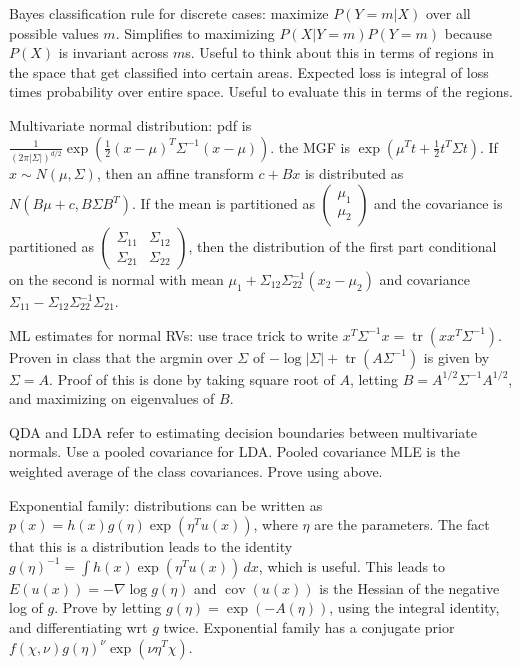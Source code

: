 \documentclass{article}
\newcommand{\openm}{\begin{pmatrix}}
\newcommand{\closem}{\end{pmatrix}}
\DeclareMathOperator{\tr}{tr}
\DeclareMathOperator{\cov}{cov}
\begin{document}
\small
Bayes classification rule for discrete cases: maximize $P(Y=m|X)$ over all possible values $m$. Simplifies to maximizing $P(X|Y=m)P(Y=m)$ because $P(X)$ is invariant across $m$s. Useful to think about this in terms of regions in the space that get classified into certain areas. Expected loss is integral of loss times probability over entire space. Useful to evaluate this in terms of the regions.

Multivariate normal distribution: pdf is $\frac{1}{(2\pi|\Sigma|)^{d/2}}\exp\left(\frac{1}{2}(x-\mu)^T\Sigma^{-1}(x-\mu)\right)$. the MGF is $\exp\left(\mu^Tt+\frac{1}{2}t^T\Sigma t\right)$. If $x\sim N(\mu,\Sigma)$, then an affine transform $c+Bx$ is distributed as $N(B\mu+c, B\Sigma B^T)$. If the mean is partitioned as $\openm \mu_1\\\mu_2\closem$ and the covariance is partitioned as $\openm\Sigma_{11}&\Sigma_{12}\\\Sigma_{21}&\Sigma_{22}\closem$, then the distribution of the first part conditional on the second is normal with mean $\mu_1+\Sigma_{12}\Sigma_{22}^{-1}(x_2-\mu_2)$ and covariance $\Sigma_{11}-\Sigma_{12}\Sigma_{22}^{-1}\Sigma_{21}$. 

ML estimates for normal RVs: use trace trick to write $x^T\Sigma^{-1} x=\tr(xx^T\Sigma^{-1})$. Proven in class that the argmin over $\Sigma$ of $-\log|\Sigma|+\tr(A\Sigma^{-1})$ is given by $\Sigma=A$. Proof of this is done by taking square root of $A$, letting $B=A^{1/2}\Sigma^{-1}A^{1/2}$, and maximizing on eigenvalues of $B$.

QDA and LDA refer to estimating decision boundaries between multivariate normals. Use a pooled covariance for LDA. Pooled covariance MLE is the weighted average of the class covariances. Prove using above.

Exponential family: distributions can be written as $p(x)=h(x)g(\eta)\exp(\eta^Tu(x))$, where $\eta$ are the parameters. The fact that this is a distribution leads to the identity $g(\eta)^{-1}=\int h(x)\exp(\eta^Tu(x))\,dx$, which is useful. This leads to $E(u(x))=-\nabla \log g(\eta)$ and $\cov(u(x))$ is the Hessian of the negative log of $g$. Prove by letting $g(\eta)=\exp(-A(\eta))$, using the integral identity, and differentiating wrt $g$ twice. Exponential family has a conjugate prior $f(\chi,\nu)g(\eta)^\nu\exp(\nu\eta^T\chi)$.
\end{document}
